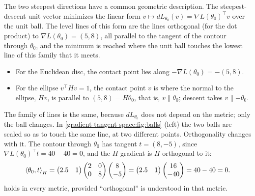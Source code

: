 \begin{notechapter}
The two steepest directions have a common geometric description. The steepest-descent unit
vector minimizes the linear form $v\mapsto dL_{\theta_0}(v) = \nabla L(\theta_0)^\top v$ over the unit ball. The level lines of this
form are the lines orthogonal (for the dot product) to $\nabla L(\theta_0) = (5, 8)$, all parallel to the tangent of
the contour through $\theta_0$, and the minimum is reached where the unit ball touches the lowest line of
this family that it meets.
\begin{itemize}[nosep]
  \item For the Euclidean disc, the contact point lies along $-\nabla L(\theta_0) = -(5, 8)$.
  \item For the ellipse $v^\top Hv = 1$, the contact point $v$ is where the normal to the ellipse, $Hv$, is parallel to
        $(5, 8) = H\theta_0$, that is, $v\parallel\theta_0$; descent takes $v\parallel-\theta_0$.
\end{itemize}
The family of lines is the same, because $dL_{\theta_0}$ does not depend on the metric; only the ball changes.
In \cref{gradient-tangent-space:fig:balls} (left) the two balls are scaled so as to touch the same
line, at two different points.
Orthogonality changes with it. The contour through $\theta_0$ has tangent $t = (8, -5)$, since
$\nabla L(\theta_0)^\top t = 40 - 40 = 0$, and the $H$-gradient is $H$-orthogonal to it:
\[
  \left\langle \theta_0, t \right\rangle_H = \begin{pmatrix}2.5 & 1\end{pmatrix}\begin{pmatrix}2 & 0\\0 & 8\end{pmatrix}\begin{pmatrix}8\\-5\end{pmatrix}
  = \begin{pmatrix}2.5 & 1\end{pmatrix}\begin{pmatrix}16\\-40\end{pmatrix} = 40 - 40 = 0 .
\]
 holds in every metric, provided ``orthogonal'' is understood in
that metric.


\end{notechapter}
